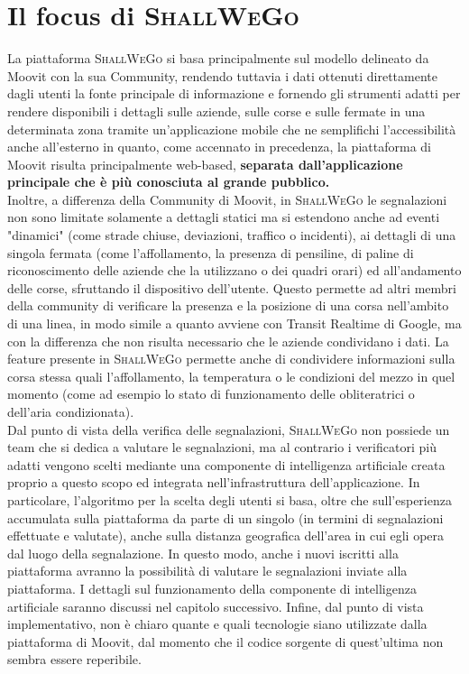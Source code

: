         

\newpage
\section{Il focus di \textsc{ShallWeGo}}
    La piattaforma \textsc{ShallWeGo} si basa principalmente sul modello delineato da Moovit con la sua Community, rendendo tuttavia i dati ottenuti direttamente dagli utenti la fonte principale di informazione e fornendo gli strumenti adatti per rendere disponibili i dettagli sulle aziende, sulle corse e sulle fermate in una determinata zona tramite un'applicazione mobile che ne semplifichi l'accessibilità anche all'esterno in quanto, come accennato in precedenza, la piattaforma di Moovit risulta principalmente web-based, \textbf{separata dall'applicazione principale che è più conosciuta al grande pubblico.} \\
    Inoltre, a differenza della Community di Moovit, in \textsc{ShallWeGo} le segnalazioni non sono limitate solamente a dettagli statici ma si estendono anche ad eventi "dinamici" (come strade chiuse, deviazioni, traffico o incidenti), ai dettagli di una singola fermata (come l'affollamento, la presenza di pensiline, di paline di riconoscimento delle aziende che la utilizzano o dei quadri orari) ed all'andamento delle corse, sfruttando il dispositivo dell'utente. Questo permette ad altri membri della community di verificare la presenza e la posizione di una corsa nell'ambito di una linea, in modo simile a quanto avviene con Transit Realtime di Google, ma con la differenza che non risulta necessario che le aziende condividano i dati. La feature presente in \textsc{ShallWeGo} permette anche di condividere informazioni sulla corsa stessa quali l'affollamento, la temperatura o le condizioni del mezzo in quel momento (come ad esempio lo stato di funzionamento delle obliteratrici o dell'aria condizionata). \\
    Dal punto di vista della verifica delle segnalazioni, \textsc{ShallWeGo} non possiede un team che si dedica a valutare le segnalazioni, ma al contrario i verificatori più adatti vengono scelti mediante una componente di intelligenza artificiale creata proprio a questo scopo ed integrata nell'infrastruttura dell'applicazione. In particolare, l'algoritmo per la scelta degli utenti si basa, oltre che sull'esperienza accumulata sulla piattaforma da parte di un singolo (in termini di segnalazioni effettuate e valutate), anche sulla distanza geografica dell'area in cui egli opera dal luogo della segnalazione. In questo modo, anche i nuovi iscritti alla piattaforma avranno la possibilità di valutare le segnalazioni inviate alla piattaforma. I dettagli sul funzionamento della componente di intelligenza artificiale saranno discussi nel capitolo successivo. Infine, dal punto di vista implementativo, non è chiaro quante e quali tecnologie siano utilizzate dalla piattaforma di Moovit, dal momento che il codice sorgente di quest'ultima non sembra essere reperibile.